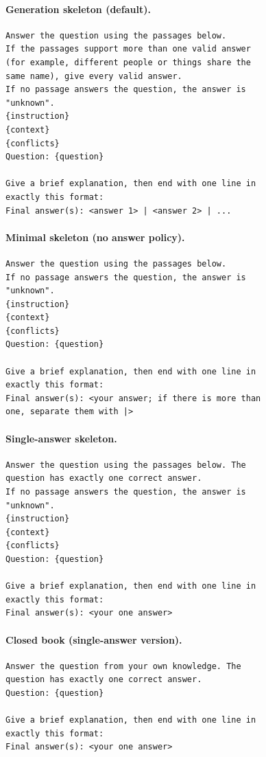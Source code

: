 \paragraph{Generation skeleton (default).}
\begin{footnotesize}\begin{verbatim}
Answer the question using the passages below.
If the passages support more than one valid answer
(for example, different people or things share the
same name), give every valid answer.
If no passage answers the question, the answer is
"unknown".
{instruction}
{context}
{conflicts}
Question: {question}

Give a brief explanation, then end with one line in
exactly this format:
Final answer(s): <answer 1> | <answer 2> | ...
\end{verbatim}\end{footnotesize}
\paragraph{Minimal skeleton (no answer policy).}
\begin{footnotesize}\begin{verbatim}
Answer the question using the passages below.
If no passage answers the question, the answer is
"unknown".
{instruction}
{context}
{conflicts}
Question: {question}

Give a brief explanation, then end with one line in
exactly this format:
Final answer(s): <your answer; if there is more than
one, separate them with |>
\end{verbatim}\end{footnotesize}
\paragraph{Single-answer skeleton.}
\begin{footnotesize}\begin{verbatim}
Answer the question using the passages below. The
question has exactly one correct answer.
If no passage answers the question, the answer is
"unknown".
{instruction}
{context}
{conflicts}
Question: {question}

Give a brief explanation, then end with one line in
exactly this format:
Final answer(s): <your one answer>
\end{verbatim}\end{footnotesize}
\paragraph{Closed book (single-answer version).}
\begin{footnotesize}\begin{verbatim}
Answer the question from your own knowledge. The
question has exactly one correct answer.
Question: {question}

Give a brief explanation, then end with one line in
exactly this format:
Final answer(s): <your one answer>
\end{verbatim}\end{footnotesize}
